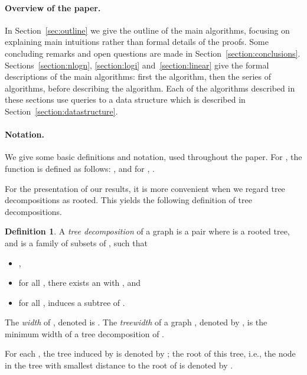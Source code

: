 \documentclass[a4paper,11pt]{article}
\theoremstyle{definition}
\newtheorem{definition}[lemma]{Definition}
\theoremstyle{remark}
\begin{document}
\paragraph{Overview of the paper.}
In Section~\ref{sec:outline} we give the outline of the main algorithms, focusing on explaining main intuitions rather than formal details of the proofs.
Some concluding remarks and open questions are made in Section~\ref{section:conclusions}. 
Sections~\ref{section:nlogn}, \ref{section:logi}
and~\ref{section:linear} give the formal descriptions of the main algorithms: first the  algorithm, then the series of 
algorithms, before describing the  algorithm.  Each of the
algorithms described in these sections use queries to a data structure
which is described in Section~\ref{section:datastructure}.



















\paragraph{Notation.}
We give some basic definitions and notation, used throughout the paper.  For
, the function  is defined
as follows: , and for ,
.

For the presentation of our results, it is more convenient when we
regard tree decompositions as rooted.  This yields the following
definition of tree decompositions.
\begin{definition}
  \label{def:prelim:treewidth}
  A \emph{tree decomposition} of a graph  is a pair  where  is a rooted tree,
  and  is a family of subsets of , such that
  \begin{itemize}
  \item ,
  \item for all , there exists an  with ,
    and
  \item for all ,  induces a
    subtree of .
  \end{itemize}
  The \emph{width} of , denoted
   is .  The \emph{treewidth} of a
  graph , denoted by , is the minimum width of a tree
  decomposition of .
\end{definition}
For each , the tree induced by  is denoted by ; the
root of this tree, i.e., the node in the tree with smallest distance
to the root of  is denoted by .
\end{document}
